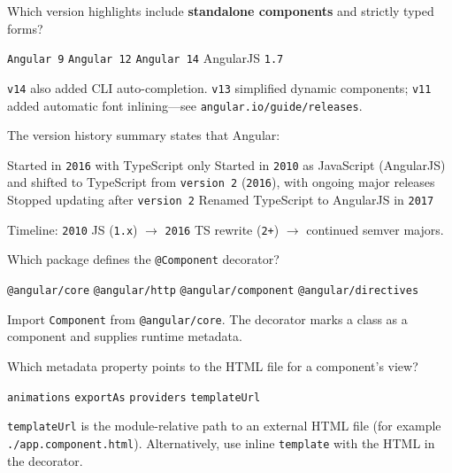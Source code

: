 \question[4]
Which version highlights include \textbf{standalone components} and strictly typed forms?
\begin{choices}
  \choice \texttt{Angular~9}
  \choice \texttt{Angular~12}
  \CorrectChoice \texttt{Angular~14}
  \choice AngularJS \texttt{1.7}
\end{choices}
\begin{solution}
  \texttt{v14} also added CLI auto-completion. \texttt{v13} simplified dynamic components; \texttt{v11} added automatic font inlining---see \texttt{angular.io/guide/releases}.
\end{solution}

\question[4]
The version history summary states that Angular:
\begin{choices}
  \choice Started in \texttt{2016} with TypeScript only
  \CorrectChoice Started in \texttt{2010} as JavaScript (AngularJS) and shifted to TypeScript from \texttt{version~2} (\texttt{2016}), with ongoing major releases
  \choice Stopped updating after \texttt{version~2}
  \choice Renamed TypeScript to AngularJS in \texttt{2017}
\end{choices}
\begin{solution}
  Timeline: \texttt{2010} JS (\texttt{1.x}) $\rightarrow$ \texttt{2016} TS rewrite (\texttt{2+}) $\rightarrow$ continued semver majors.
\end{solution}

\question[4]
Which package defines the \texttt{@Component} decorator?
\begin{choices}
  \CorrectChoice \texttt{@angular/core}
  \choice \texttt{@angular/http}
  \choice \texttt{@angular/component}
  \choice \texttt{@angular/directives}
\end{choices}
\begin{solution}
  Import \lstinline[style=tsinline]{Component} from \lstinline[style=tsinline]{@angular/core}. The decorator marks a class as a component and supplies runtime metadata.
\end{solution}

\question[4]
Which metadata property points to the HTML file for a component's view?
\begin{choices}
  \choice \texttt{animations}
  \choice \texttt{exportAs}
  \choice \texttt{providers}
  \CorrectChoice \texttt{templateUrl}
\end{choices}
\begin{solution}
  \texttt{templateUrl} is the module-relative path to an external HTML file (for example \lstinline[style=tsinline]{./app.component.html}). Alternatively, use inline \texttt{template} with the HTML in the decorator.
\end{solution}

